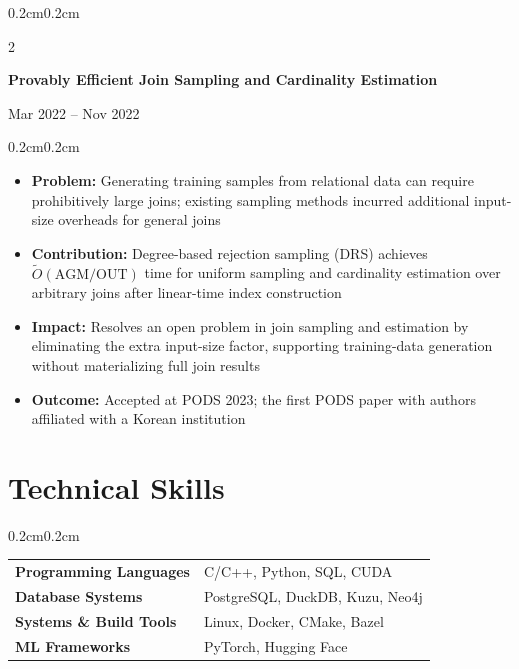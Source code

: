 \documentclass[10pt, letterpaper]{article}
\newenvironment{highlights}[1][]{
    \begin{itemize}[
        topsep=0.10cm,
        parsep=0.10cm,
        partopsep=0pt,
        itemsep=0pt,
        leftmargin=0.4cm+10pt,
        #1
    ]
}{
    \end{itemize}
}
\newenvironment{onecolentry}{
    \begin{adjustwidth}{0.2cm}{0.2cm}
}{
    \end{adjustwidth}
}
\newenvironment{twocolentry}[2][]{
    \onecolentry
    \def\secondColumn{#2}
    \setcolumnwidth{\fill, 4.5cm}
    \begin{paracol}{2}
}{
    \switchcolumn \raggedleft \secondColumn
    \end{paracol}
    \endonecolentry
}
\begin{document}
\vspace{2mm}

\begin{twocolentry}{Mar 2022 -- Nov 2022}
\textbf{Provably Efficient Join Sampling and Cardinality Estimation}
\end{twocolentry}
\begin{onecolentry}
\begin{highlights}[parsep=0pt]
    \item \textbf{Problem:} Generating training samples from relational data can require prohibitively large joins; existing sampling methods incurred additional input-size overheads for general joins
    \item \textbf{Contribution:} Degree-based rejection sampling (DRS) achieves $\widetilde{O}(\mathrm{AGM}/\mathrm{OUT})$ time for uniform sampling and cardinality estimation over arbitrary joins after linear-time index construction
    \item \textbf{Impact:} Resolves an open problem in join sampling and estimation by eliminating the extra input-size factor, supporting training-data generation without materializing full join results
    \item \textbf{Outcome:} Accepted at PODS 2023; the first PODS paper with authors affiliated with a Korean institution
\end{highlights}
\end{onecolentry}


\section*{Technical Skills}
\vspace{1mm}

\begin{onecolentry}
\renewcommand{\arraystretch}{1.18}
\setlength{\tabcolsep}{6pt}
\begin{tabularx}{\textwidth}{
    >{\raggedright\arraybackslash\bfseries}p{4.6cm}
    >{\raggedright\arraybackslash}X
}
Programming Languages & C/C++, Python, SQL, CUDA \\
Database Systems & PostgreSQL, DuckDB, Kuzu, Neo4j \\
Systems \& Build Tools & Linux, Docker, CMake, Bazel \\
ML Frameworks & PyTorch, Hugging Face \\
\end{tabularx}
\end{onecolentry}
\end{document}
